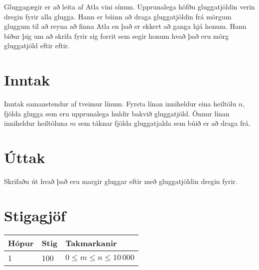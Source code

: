 
Gluggagægir er að leita af Atla vini sínum.
Upprunalega höfðu gluggatjöldin verin dregin fyrir alla glugga.
Hann er búinn að draga gluggatjöldin frá mörgum gluggum til að reyna að finna Atla en það er ekkert að ganga hjá honum.
Hann biður þig um að skrifa fyrir sig forrit sem segir honum hvað það eru mörg gluggatjöld eftir eftir.

\section*{Inntak}
Inntak samanstendur af tveimur línum.
Fyrsta línan inniheldur eina heiltölu $n$, fjölda glugga sem eru upprunalega huldir bakvið gluggatjöld.
Önnur línan inniheldur heiltöluna $m$ sem táknar fjölda gluggatjalda sem búið er að draga frá.

\section*{Úttak}
Skrifaðu út hvað það eru margir gluggar eftir með gluggatjöldin dregin fyrir.

\section*{Stigagjöf}
\begin{tabular}{|l|l|l|}
\hline
Hópur & Stig & Takmarkanir \\ \hline
1     & 100   & $0 \leq m \leq n \leq 10\,000$ \\ \hline
\end{tabular}

